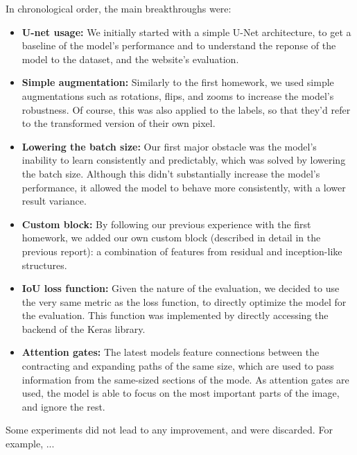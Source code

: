 \documentclass[11pt]{article}
\begin{document}
\begin{multicols}{2}
      In chronological order, the main breakthroughs were:
      \begin{itemize}[leftmargin=*]
            \setlength\itemsep{0em}
            \item \textbf{U-net usage:} We initially started with a simple U-Net architecture, to get a baseline of the model's performance and to understand the reponse of the model to the dataset, and the website's evaluation.
            \item \textbf{Simple augmentation:} Similarly to the first homework, we used simple augmentations such as rotations, flips, and zooms to increase the model's robustness. Of course, this was also applied to the labels, so that they'd refer to the transformed version of their own pixel.
            \item \textbf{Lowering the batch size:} Our first major obstacle was the model's inability to learn consistently and predictably, which was solved by lowering the batch size. Although this didn't substantially increase the model's performance, it allowed the model to behave more consistently, with a lower result variance.
            \item \textbf{Custom block:} By following our previous experience with the first homework, we added our own custom block (described in detail in the previous report): a combination of features from residual and inception-like structures.
            \item \textbf{IoU loss function:} Given the nature of the evaluation, we decided to use the very same metric as the loss function, to directly optimize the model for the evaluation. This function was implemented by directly accessing the backend of the Keras library.
            \item \textbf{Attention gates:} The latest models feature connections between the contracting and expanding paths of the same size, which are used to pass information from the same-sized sections of the mode. As attention gates\cite{oktay2018attentionunetlearninglook} are used, the model is able to focus on the most important parts of the image, and ignore the rest.
      \end{itemize}

      Some experiments did not lead to any improvement, and were discarded. For example, ...



\end{multicols}
\end{document}
